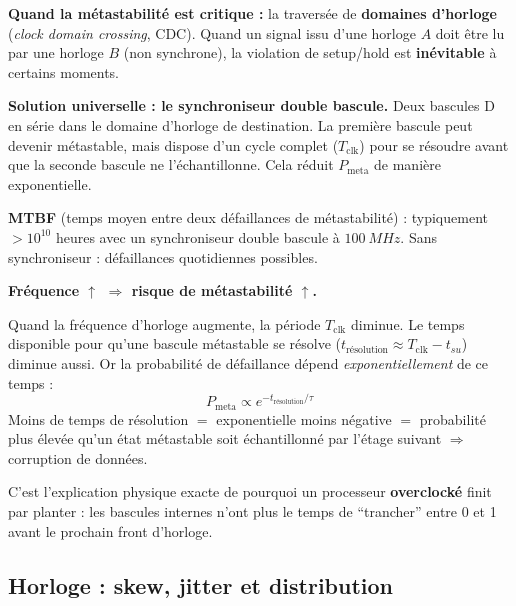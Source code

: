 \documentclass[12pt,a4paper,twoside]{book}
\begin{document}
\begin{pratique}
\textbf{Quand la métastabilité est critique :} la traversée de \textbf{domaines d'horloge} (\textit{clock domain crossing}, CDC). Quand un signal issu d'une horloge $A$ doit être lu par une horloge $B$ (non synchrone), la violation de setup/hold est \textbf{inévitable} à certains moments.

\textbf{Solution universelle : le synchroniseur double bascule.} Deux bascules D en série dans le domaine d'horloge de destination. La première bascule peut devenir métastable, mais dispose d'un cycle complet ($T_{\text{clk}}$) pour se résoudre avant que la seconde bascule ne l'échantillonne. Cela réduit $P_{\text{meta}}$ de manière exponentielle.

\textbf{MTBF} (temps moyen entre deux défaillances de métastabilité) : typiquement $> 10^{10}$ heures avec un synchroniseur double bascule à $\SI{100}{MHz}$. Sans synchroniseur : défaillances quotidiennes possibles.
\end{pratique}

\begin{attention}
\textbf{Fréquence $\uparrow$ $\Rightarrow$ risque de métastabilité $\uparrow$.}

Quand la fréquence d'horloge augmente, la période $T_{\text{clk}}$ diminue. Le temps disponible pour qu'une bascule métastable se résolve ($t_{\text{résolution}} \approx T_{\text{clk}} - t_{su}$) diminue aussi. Or la probabilité de défaillance dépend \textit{exponentiellement} de ce temps :
\[
P_{\text{meta}} \propto e^{-t_{\text{résolution}}/\tau}
\]
Moins de temps de résolution $=$ exponentielle moins négative $=$ probabilité plus élevée qu'un état métastable soit échantillonné par l'étage suivant $\Rightarrow$ corruption de données.

C'est l'explication physique exacte de pourquoi un processeur \textbf{overclocké} finit par planter : les bascules internes n'ont plus le temps de ``trancher'' entre 0 et 1 avant le prochain front d'horloge.
\end{attention}

\subsection{Horloge : skew, jitter et distribution}
\end{document}
